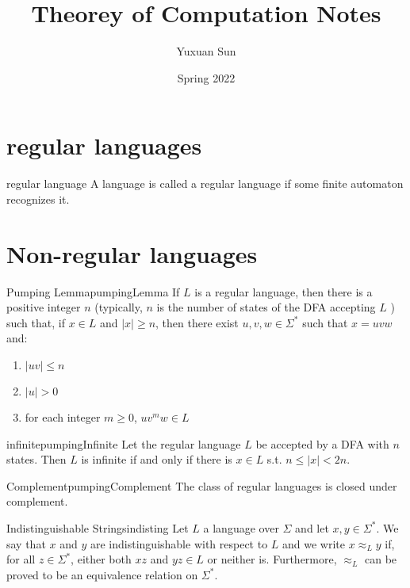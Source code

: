 \documentclass[a4paper]{article}
\title{Theorey of Computation Notes}
\author{Yuxuan Sun}
\date{Spring 2022}
\begin{document}
\maketitle

\tableofcontents

\newpage

\section{regular languages}

\begin{Definition}{regular language}
	A language is called a regular language if some finite automaton recognizes it.
\end{Definition}

\section{Non-regular languages}

\begin{Theorem}{Pumping Lemma}{pumpingLemma}
If $L$ is a regular language, then there is a positive integer $n$ (typically, $n$ is the number of states of the DFA accepting $L$ ) such that, if $x \in L$ and $|x| \geq n$, then there exist $u, v, w \in \Sigma^{*}$ such that $x=u v w$ and:
\begin{enumerate}
\item $\left| uv \right|\le n $ 
\item $\left| u \right| > 0 $ 
\item for each integer $m \ge 0$, $uv^mw\in L$
\end{enumerate}
\end{Theorem}

\begin{Corollary}{infinite}{pumpingInfinite}
Let the regular language $L$ be accepted by a DFA with  $n$ states. Then  $L$ is infinite if and only if there is  $x \in L$ s.t. $n \le \left| x \right| < 2n $.
\end{Corollary}

\begin{Theorem}{Complement}{pumpingComplement}
The class of regular languages is closed under complement.
	
\end{Theorem}

\begin{Definition}{Indistinguishable Strings}{indisting}
Let $L$ a language over $\Sigma$ and let $x, y \in \Sigma^{*}$. We say that $x$ and $y$ are indistinguishable with respect to $L$ and we write $x \approx_{L} y$ if, for all $z \in \Sigma^{*}$, either both $x z$ and $y z \in L$ or neither is. Furthermore, $\approx_{L}$ can be proved to be an equivalence relation on $\Sigma^{*}$.
\end{Definition}
\end{document}
